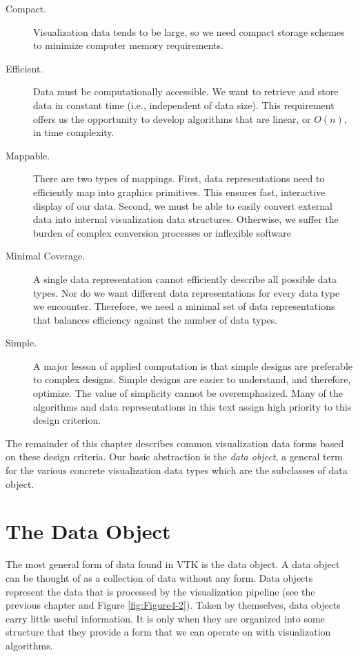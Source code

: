 \begin{description}

\item[Compact.] Visualization data tends to be large, so we need compact storage schemes to minimize computer memory requirements.

\item[Efficient.] Data must be computationally accessible. We want to retrieve and store data in constant time (i.e., independent of data size). This requirement offers us the opportunity to develop algorithms that are linear, or $O(n)$, in time complexity.

\item[Mappable.] There are two types of mappings. First, data representations need to efficiently map into graphics primitives. This ensures fast, interactive display of our data. Second, we must be able to easily convert external data into internal visualization data structures. Otherwise, we suffer the burden of complex conversion processes or inflexible software

\item[Minimal Coverage.] A single data representation cannot efficiently describe all possible data types. Nor do we want different data representations for every data type we encounter. Therefore, we need a minimal set of data representations that balances efficiency against the number of data types.

\item[Simple.] A major lesson of applied computation is that simple designs are preferable to complex designs. Simple designs are easier to understand, and therefore, optimize. The value of simplicity cannot be overemphasized. Many of the algorithms and data representations in this text assign high priority to this design criterion.

\end{description}

The remainder of this chapter describes common visualization data forms based on these design criteria. Our basic abstraction is the \emph{data object}, a general term for the various concrete visualization data types which are the subclasses of data object. 

\section{The Data Object}

The most general form of data found in VTK is the data object. A data object can be thought of as a collection of data without any form. Data objects represent the data that is processed by the visualization pipeline (see the previous chapter and Figure \ref{fig:Figure4-2}). Taken by themselves, data objects carry little useful information. It is only when they are organized into some structure that they provide a form that we can operate on with visualization algorithms.

